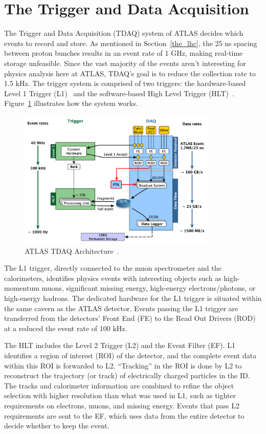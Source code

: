 \clearpage
\section{The Trigger and Data Acquisition}
\label{The_Trigger_and_Data_Acquisition}
The Trigger and Data Acquisition (TDAQ) system of ATLAS decides which events to record and store. As mentioned in Section~\ref{the_lhc}, the 25 ns spacing between proton bunches results in an event rate of 1 GHz, making real-time storage unfeasible.
Since the vast majority of the events aren't interesting for physics analysis here at ATLAS, TDAQ's goal is to reduce the collection rate to 1.5 kHz.
The trigger system is comprised of two triggers: the hardware-based Level 1 Trigger (L1)~\cite{ATLAS:1998ad} and the software-based High Level Trigger (HLT)~\cite{ATLAS:2003aa}.
Figure~\ref{fig:tdaq_layout} illustrates how the system works.

\begin{figure}[ht]
    \centering
    \includegraphics[width=0.85\textwidth]{figures/LHC/tdaq_1.png}
    \caption[]{ATLAS TDAQ Architecture~\cite{Abbott_2016}.}
    \label{fig:tdaq_layout}
\end{figure}

The L1 trigger, directly connected to the muon spectrometer and the calorimeters, identifies physics events with interesting objects such as high-momentum muons, significant missing energy, high-energy electrons/photons, or high-energy hadrons.
The dedicated hardware for the L1 trigger is situated within the same cavern as the ATLAS detector.
Events passing the L1 trigger are transferred from the detectors' Front End (FE) to the Read Out Drivers (ROD) at a reduced the event rate of 100 kHz.

The HLT includes the Level 2 Trigger (L2) and the Event Filter (EF). L1 identifies a region of interest (ROI) of the detector, and the complete event data within this ROI is forwarded to L2. 
``Tracking'' in the ROI is done by L2 to reconstruct the trajectory (or track) of electrically charged particles in the ID.
The tracks and calorimeter information are combined to refine the object selection with higher resolution than what was used in L1, such as tighter requirements on electrons, muons, and missing energy.
Events that pass L2 requirements are sent to the EF, which uses data from the entire detector to decide whether to keep the event.


